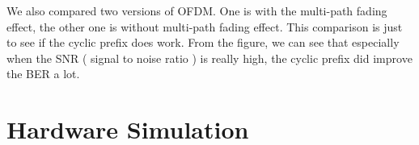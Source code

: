\documentclass[twocolumn,conference]{IEEEtran}
\begin{document}
We also compared two versions of OFDM. One is with the multi-path fading effect, the other one is without multi-path fading effect. This comparison is just to see if the cyclic prefix does work. From the figure, we can see that especially when the SNR ( signal to noise ratio ) is really high, the cyclic prefix did improve the BER a lot.


\section{Hardware Simulation}






\end{document}
